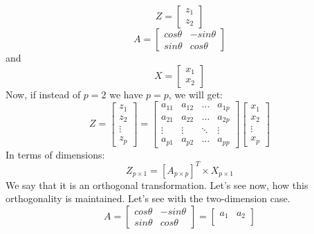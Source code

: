 \documentclass[12pt,a4paper]{report}
\begin{document}
\begin{equation}
Z = 
\begin{bmatrix}
    z_{1} \\
    z_{2}
\end{bmatrix}
\end{equation} 
\begin{equation}
A = 
\begin{bmatrix}
    cos \theta & -sin \theta \\
     sin \theta & cos \theta
\end{bmatrix}
\end{equation} 
and 
\begin{equation}
X = 
\begin{bmatrix}
    x_{1} \\
    x_{2}
\end{bmatrix}
\end{equation}
Now, if instead of $p=2$ we have $p=p$, we will get:\\
\begin{equation}
Z = 
\begin{bmatrix}
    z_{1} \\
    z_{2} \\
    \vdots \\
    z_{p} 
\end{bmatrix}
= 
\begin{bmatrix}
    a_{11} & a_{12} & \dots  & a_{1p} \\
    a_{21} & a_{22} & \dots  & a_{2p} \\
    \vdots & \vdots & \ddots & \vdots \\
    a_{p1} & a_{p2} & \dots  & a_{pp}
\end{bmatrix}
\begin{bmatrix}
    x_{1} \\
    x_{2} \\
    \vdots \\
    x_{p} 
\end{bmatrix}
\end{equation}
In terms of dimensions:
\begin{equation}
Z_{p \times 1} = [A_{p \times p}]^T \times X_{p \times 1}
\end{equation}
We say that it is an orthogonal transformation. Let's see now, how this orthogonality is maintained. Let's see with the two-dimension case.
\begin{equation}
A = 
\begin{bmatrix}
    cos \theta & -sin \theta \\
     sin \theta & cos \theta
\end{bmatrix}
= 
\begin{bmatrix}
    a_1 & a_2 \\
\end{bmatrix}
\end{equation} 
\end{document}
